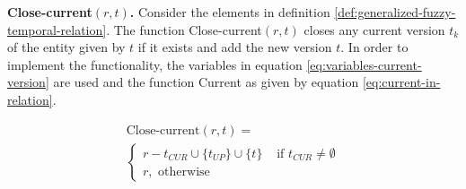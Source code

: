 % 
% 

\begin{definition}
\label{def:pvp-close-current-version}
\textbf{Close-current$\left(r, t \right)$.}
Consider the elements in definition \ref{def:generalized-fuzzy-temporal-relation}. The function Close-current$\left(r, t \right)$ closes any current version $t_k$ of the entity given by $t$ if it exists and add the new version $t$. In order to implement the functionality, the variables in equation \eqref{eq:variables-current-version} are used and the function Current as given by equation \eqref{eq:current-in-relation}.

\begin{eqnarray}
\label{eq:pvp-close-current}
\text{Close-current} \left(r, t \right) =\\
\begin{cases}
\nonumber
r - t_{CUR} \cup \lbrace t_{UP}\rbrace \cup \lbrace t \rbrace
& \mbox{ if } t_{CUR} \neq \emptyset \\
\nonumber r , \text{ otherwise}
\end{cases}
\end{eqnarray}
\end{definition}





